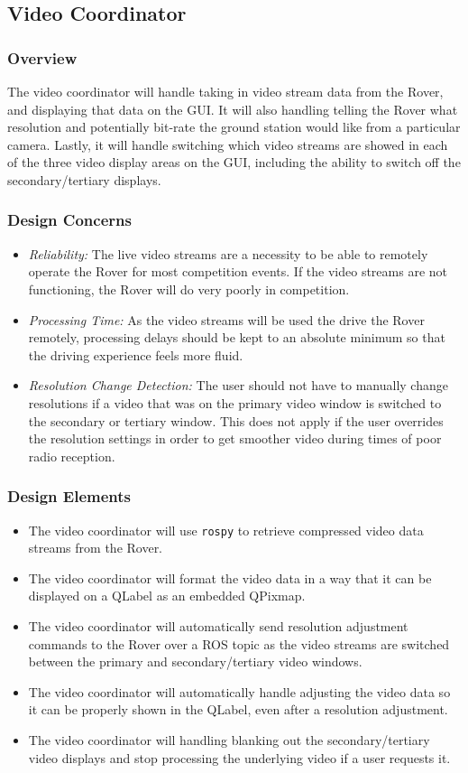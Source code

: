 \subsection{Video Coordinator}
\subsubsection{Overview}
The video coordinator will handle taking in video stream data from the Rover, and displaying that data on the GUI.
It will also handling telling the Rover what resolution and potentially bit-rate the ground station would like from a particular camera.
Lastly, it will handle switching which video streams are showed in each of the three video display areas on the GUI, including the ability to switch off the secondary/tertiary displays.

\subsubsection{Design Concerns}
\begin{itemize}
\item \textit{Reliability:} The live video streams are a necessity to be able to remotely operate the Rover for most competition events. 
If the video streams are not functioning, the Rover will do very poorly in competition.
\item \textit{Processing Time:} As the video streams will be used the drive the Rover remotely, processing delays should be kept to an absolute minimum so that the driving experience feels more fluid.
\item \textit{Resolution Change Detection:} The user should not have to manually change resolutions if a video that was on the primary video window is switched to the secondary or tertiary window.
This does not apply if the user overrides the resolution settings in order to get smoother video during times of poor radio reception.
\end{itemize}

\subsubsection{Design Elements}
\begin{itemize}
\item The video coordinator will use \texttt{rospy} to retrieve compressed video data streams from the Rover.
\item The video coordinator will format the video data in a way that it can be displayed on a QLabel as an embedded QPixmap.
\item The video coordinator will automatically send resolution adjustment commands to the Rover over a ROS topic as the video streams are switched between the primary and secondary/tertiary video windows.
\item The video coordinator will automatically handle adjusting the video data so it can be properly shown in the QLabel, even after a resolution adjustment.
\item The video coordinator will handling blanking out the secondary/tertiary video displays and stop processing the underlying video if a user requests it.
\end{itemize}

